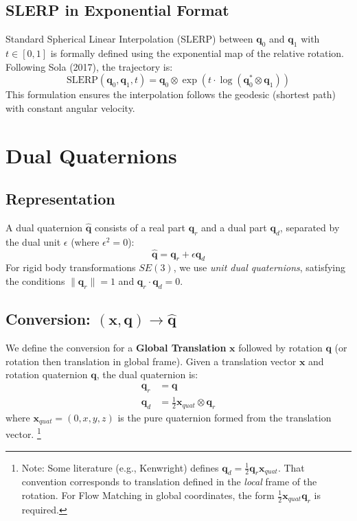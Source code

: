 \documentclass[a4paper,11pt]{article}
\begin{document}
\subsection{\texorpdfstring{SLERP in Exponential Format}{SLERP in Exponential Format}}
Standard Spherical Linear Interpolation (SLERP) between $\bm{q}_0$ and $\bm{q}_1$ with $t \in [0, 1]$ is formally defined using the exponential map of the relative rotation. Following Sola (2017), the trajectory is:
\begin{equation}
    \text{SLERP}(\bm{q}_0, \bm{q}_1, t) = \bm{q}_0 \otimes \exp\left( t \cdot \log(\bm{q}_0^* \otimes \bm{q}_1) \right)
\end{equation}
This formulation ensures the interpolation follows the geodesic (shortest path) with constant angular velocity.

\section{\texorpdfstring{Dual Quaternions}{Dual Quaternions}}

\subsection{Representation}
A dual quaternion $\hat{\bm{q}}$ consists of a real part $\bm{q}_r$ and a dual part $\bm{q}_d$, separated by the dual unit $\epsilon$ (where $\epsilon^2 = 0$):
\begin{equation}
    \hat{\bm{q}} = \bm{q}_r + \epsilon \bm{q}_d
\end{equation}
For rigid body transformations $SE(3)$, we use \textit{unit dual quaternions}, satisfying the conditions $\|\bm{q}_r\| = 1$ and $\bm{q}_r \cdot \bm{q}_d = 0$.

\subsection{\texorpdfstring{Conversion: $(\bm{x}, \bm{q}) \to \hat{\bm{q}}$}{Conversion}}
We define the conversion for a \textbf{Global Translation} $\bm{x}$ followed by rotation $\bm{q}$ (or rotation then translation in global frame). 
Given a translation vector $\bm{x}$ and rotation quaternion $\bm{q}$, the dual quaternion is:
\begin{equation}
    \begin{aligned}
        \bm{q}_r &= \bm{q} \\
        \bm{q}_d &= \frac{1}{2} \bm{x}_{quat} \otimes \bm{q}_r
    \end{aligned}
\end{equation}
where $\bm{x}_{quat} = (0, x, y, z)$ is the pure quaternion formed from the translation vector.
\footnote{Note: Some literature (e.g., Kenwright) defines $\bm{q}_d = \frac{1}{2}\bm{q}_r \bm{x}_{quat}$. That convention corresponds to translation defined in the \textit{local} frame of the rotation. For Flow Matching in global coordinates, the form $\frac{1}{2}\bm{x}_{quat}\bm{q}_r$ is required.}
\end{document}
